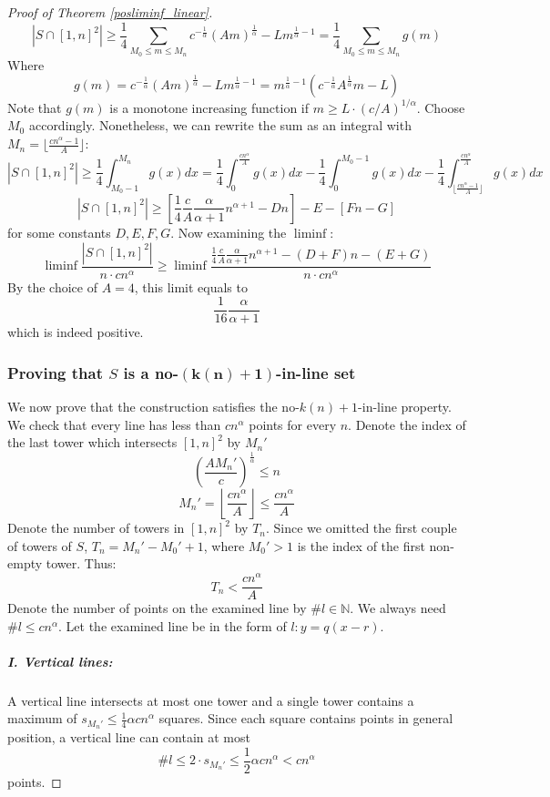 \documentclass[11pt,a4paper]{article}
\numberwithin{equation}{section}
\begin{document}
\begin{proof}[Proof of Theorem \ref{posliminf_linear}]
    $$
    |S \cap [1,n]^2| \ge   \frac14 \sum_{M_0\le m\le M_n}c^{-\frac1\alpha} (Am)^{\frac{1}{\alpha}} - Lm^{\frac1\alpha -1} = \frac14 \sum_{M_0\le m\le M_n} g(m)
    $$
    Where 
    $$g(m) = c^{-\frac1\alpha} (Am)^{\frac{1}{\alpha}} - Lm^{\frac1\alpha -1} = m^{\frac1\alpha -1}(c^{-\frac1\alpha}A^{\frac1\alpha}m-L )$$
    Note that $g(m)$ is a monotone increasing function if $m \ge L\cdot (c/A)^{1/\alpha}$. Choose $M_0$ accordingly. Nonetheless, we can rewrite the sum as an integral with $M_n = { \lfloor\frac{cn^\alpha - 1}{A}\rfloor}$:
    $$
    |S \cap [1,n]^2|\geq \frac14 \int_{M_0-1}^{M_n} g(x) dx
    = \frac14 \int_0^{\frac{cn^\alpha}{A}} g(x)dx -\frac14\int_0^{M_0-1}g(x) dx - \frac14 \int_{ \lfloor\frac{cn^\alpha - 1}{A}\rfloor}^{\frac{cn^\alpha}{A}} g(x)dx
    $$
    $$
   |S \cap [1,n]^2| \ge \left[\frac14 \frac cA \frac{\alpha}{\alpha+1}n^{\alpha + 1}  - Dn\right] -  E- [Fn - G]
    $$
    for some constants $D, E, F, G$. Now examining the $\liminf$:
    $$
    \liminf \frac{|S \cap [1,n]^2|}{n \cdot cn^\alpha}
    \geq \liminf \frac{\frac14 \frac cA \frac{\alpha}{\alpha+1}n^{\alpha + 1}  - (D+F)n  - (E+G)}{n \cdot cn^\alpha}$$
    By the choice of $A=4$, this limit equals to $$\frac{1}{16} \frac{\alpha}{\alpha + 1}
    $$
    which is indeed positive.
    \subsubsection{Proving that $S$ is a no-$\mathbf{(k(n)+1)}$-in-line set}
    
    We now prove that the construction satisfies the no-$k(n)+1$-in-line property. We check that every line has less than $cn^\alpha$ points for every $n$. Denote the index of the last tower which intersects $[1, n]^2$ by $M_n'$
    $$
    \left(\frac{AM_n'}{c}\right)^\frac{1}{\alpha} \le n
    $$
    $$
    M_n' = \left\lfloor\frac{cn^\alpha}{A}\right\rfloor\le \frac{cn^\alpha}{A}
    $$
    Denote the number of towers in $[1, n]^2$ by $T_n$. Since we omitted the first couple of towers of $S$, $T_n = M_n' - M_0' + 1$, where $M_0'>1$ is the index of the first non-empty tower. Thus:
    $$
    T_n <  \frac{cn^\alpha}{A}
    $$
    Denote the number of points on the examined line by $\#l \in \mathbb N$. We always need $\#l \le cn^\alpha$. Let the examined line be in the form of $l: y = q(x - r)$.

    \subparagraph{\bf I. Vertical lines: }
    A vertical line intersects at most one tower and a single tower contains a maximum of $s_{M_n'} \le \frac14\alpha cn^\alpha$ squares. Since each square contains points in general position, a vertical line can contain at most
    $$\#l \le 2\cdot s_{M_n'} \le \frac12\alpha cn^\alpha <cn^\alpha $$
    points.
    

\end{proof}
\end{document}
